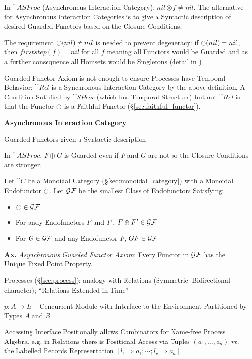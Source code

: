 \fist In $\cat{ASProc}$ (Asynchronous Interaction Category): $nil
\otimes f \neq nil$. The alternative for Asynchronous Interaction
Categories is to give a Syntactic description of desired Guarded
Functors based on the Closure Conditions.

The requirement $\ocircle(nil) \neq nil$ is needed to prevent
degeneracy: if $\ocircle(nil) = nil$, then $firststep(f) = nil$ for
all $f$ meaning all Functors would be Guarded and as a further
consequence all Homsets would be Singletons (detail in
\cite{abramsky-gay-nagarajan96})

Guarded Functor Axiom is not enough to ensure Processes have Temporal
Behavior: $\cat{Rel}$ is a Synchronous Interaction Category by the
above definition. A Condition Satisfied by $\cat{SProc}$ (which has
Temporal Structure) but not $\cat{Rel}$ is that the Functor $\ocircle$
is a Faithful Functor (\S\ref{sec:faithful_functor}).


\textbf{Asynchronous Interaction Category}

Guarded Functors given a Syntactic description

In $\cat{ASProc}$, $F \oplus G$ is Guarded even if $F$ and $G$ are not
so the Closure Conditions are stronger.

Let $\cat{C}$ be a Monoidal Category (\S\ref{sec:monoidal_category})
with a Monoidal Endofunctor $\ocircle$. Let $\mathcal{GF}$ be the
smallest Class of Endofunctors Satisfying:
\begin{itemize}
  \item $\ocircle \in \mathcal{GF}$
  \item For andy Endofunctors $F$ and $F'$, $F \oplus F' \in \mathcal{GF}$
  \item For $G \in \mathcal{GF}$ and any Endofunctor $F$,
    $G F \in \mathcal{GF}$
\end{itemize}

\textbf{Ax.} \emph{Asynchronous Guarded Functor Axiom}: Every Functor
in $\mathcal{GF}$ has the Unique Fixed Point Property.


\asterism


Processes (\S\ref{sec:process}): analogy with Relations (Symmetric,
Bidirectional character); ``Relations Extended in Time''

$p : A \rightarrow B$ -- Concurrent Module with Interface to the
Environment Partitioned by Types $A$ and $B$

Accessing Interface Positionally allows Combinators for Name-free
Process Algebra, e.g. in Relations there is Positional Access via
Tuples $(a_1, \ldots, a_n)$ vs. the Labelled Records Representation $[
  l_1 \Rightarrow a_1; \cdots ; l_n \Rightarrow a_n]$

